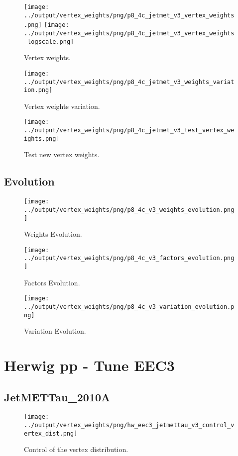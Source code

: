 \documentclass[11pt]{book}
\begin{document}
\begin{figure}[ht]
\centering
\texttt{[image: ../output/vertex\_weights/png/p8\_4c\_jetmet\_v3\_vertex\_weights.png]}
\texttt{[image: ../output/vertex\_weights/png/p8\_4c\_jetmet\_v3\_vertex\_weights\_logscale.png]}
\caption{Vertex weights.}
\end{figure}

\begin{figure}[ht]
\centering
\texttt{[image: ../output/vertex\_weights/png/p8\_4c\_jetmet\_v3\_weights\_variation.png]}
\caption{Vertex weights variation.}
\end{figure}

\begin{figure}[ht]
\centering
\texttt{[image: ../output/vertex\_weights/png/p8\_4c\_jetmet\_v3\_test\_vertex\_weights.png]}
\caption{Test new vertex weights.}
\end{figure}
\clearpage

\subsection{Evolution}
\begin{figure}[ht]
\centering
\texttt{[image: ../output/vertex\_weights/png/p8\_4c\_v3\_weights\_evolution.png]}
\caption{Weights Evolution.}
\end{figure}


\begin{figure}[ht]
\centering
\texttt{[image: ../output/vertex\_weights/png/p8\_4c\_v3\_factors\_evolution.png]}
\caption{Factors Evolution.}
\end{figure}

\begin{figure}[ht]
\centering
\texttt{[image: ../output/vertex\_weights/png/p8\_4c\_v3\_variation\_evolution.png]}
\caption{Variation Evolution.}
\end{figure}
\clearpage


\section{Herwig pp - Tune EEC3}
\subsection{JetMETTau\_2010A}
\begin{figure}[ht]
\centering
\texttt{[image: ../output/vertex\_weights/png/hw\_eec3\_jetmettau\_v3\_control\_vertex\_dist.png]}
\caption{Control of the vertex distribution.}
\end{figure}
\end{document}
